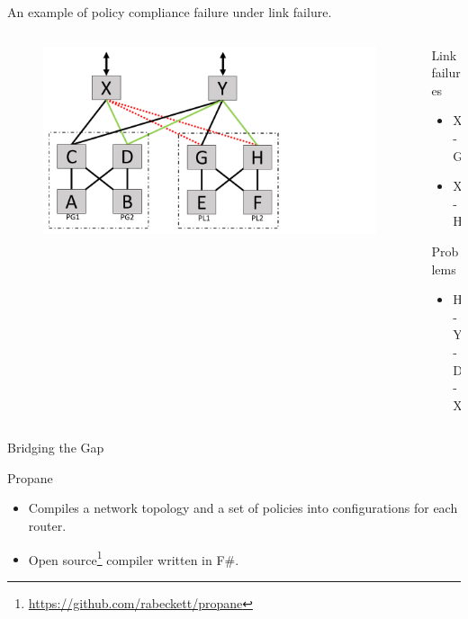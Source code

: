 \begin{frame}{An example of policy compliance failure under link failure.}
    \begin{columns}
        \begin{column}{0.45\textwidth}
            \begin{figure}
                \includegraphics[width=1\textwidth,keepaspectratio,clip,trim={0cm 0cm 9cm 0cm}]{figures/ex2_1_failed_links_new_path.pdf}
            \end{figure}
        \end{column}
        \begin{column}{0.50\textwidth}
            \begin{block}{Link failures}
                \begin{itemize}
                    \item X-G
                    \item X-H
                \end{itemize}
            \end{block}
            \begin{block}{Problems}
                \begin{itemize}
                    \item H-Y-D-X
                \end{itemize}
            \end{block}
        \end{column}
    \end{columns}
\end{frame}

\begin{frame}{Bridging the Gap}
    \begin{block}{Propane}
        \begin{itemize}
            \item Compiles a network topology and a set of policies into configurations for each router.
            \item Open source\footnote{\url{https://github.com/rabeckett/propane}} compiler written in F\#.
        \end{itemize}
    \end{block}
\end{frame}

